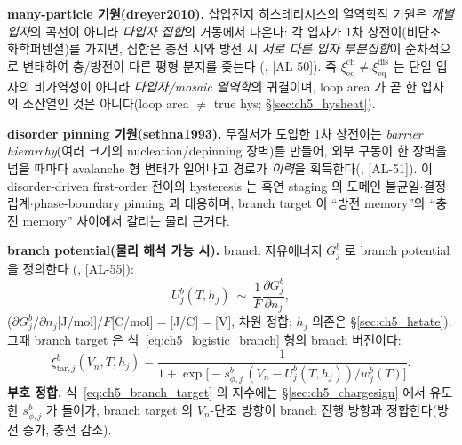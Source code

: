 \documentclass[11pt,a4paper]{article}
\newcommand{\eq}{\mathrm{eq}}
\newcommand{\dis}{\mathrm{dis}}
\newcommand{\chg}{\mathrm{ch}}
\newcommand{\tar}{\mathrm{tar}}
\newcommand{\AL}[1]{\textsf{[AL-#1]}}
\begin{document}
\textbf{many-particle 기원(dreyer2010).} 삽입전지 히스테리시스의 열역학적 기원은 \emph{개별 입자}의 곡선이
아니라 \emph{다입자 집합}의 거동에서 나온다: 각 입자가 1차 상전이(비단조 화학퍼텐셜)를 가지면, 집합은 충전 시와
방전 시 \emph{서로 다른 입자 부분집합}이 순차적으로 변태하여 충/방전이 다른 평형 분지를 좇는다
(\cite{dreyer2010}, \AL{50}). 즉 $\xi_{\eq}^{\chg}\ne\xi_{\eq}^{\dis}$ 는 단일 입자의 비가역성이 아니라
\emph{다입자/mosaic 열역학}의 귀결이며, loop area 가 곧 한 입자의 소산열인 것은 아니다(loop area $\ne$ true
hys; \S\ref{sec:ch5_hysheat}).

\textbf{disorder pinning 기원(sethna1993).} 무질서가 도입한 1차 상전이는 \emph{barrier hierarchy}(여러
크기의 nucleation/depinning 장벽)를 만들어, 외부 구동이 한 장벽을 넘을 때마다 avalanche 형 변태가 일어나고
경로가 \emph{이력}을 획득한다(\cite{sethna1993}, \AL{51}). 이 disorder-driven first-order 전이의 hysteresis
는 흑연 staging 의 도메인 불균일$\cdot$결정립계$\cdot$phase-boundary pinning 과 대응하며, branch target 이
``방전 memory''와 ``충전 memory'' 사이에서 갈리는 물리 근거다.

\textbf{branch potential(물리 해석 가능 시).} branch 자유에너지 $G_j^b$ 로 branch potential 을 정의한다
(\cite{dreyer2010,sethna1993}, \AL{55}):
\begin{equation}
U_j^b(T,h_j)\ \sim\ \frac{1}{F}\frac{\partial G_j^b}{\partial n_j},
\label{eq:ch5_branch_potential}
\end{equation}
($\partial G_j^b/\partial n_j$[J/mol]$/F$[C/mol]$=$[J/C]$=$[V], 차원 정합; $h_j$ 의존은 \S\ref{sec:ch5_hstate}).
그때 branch target 은 식~\eqref{eq:ch5_logistic_branch} 형의 branch 버전이다:
\begin{equation}
\xi_{\tar,j}^b(V_n,T,h_j)=\frac{1}{1+\exp\!\big[-s_{\phi,j}^b\,(V_n-U_j^b(T,h_j))/w_j^b(T)\big]}.
\label{eq:ch5_branch_target}
\end{equation}
\textbf{부호 정합.} 식~\eqref{eq:ch5_branch_target} 의 지수에는 \S\ref{sec:ch5_chargesign} 에서 유도한
$s_{\phi,j}^b$ 가 들어가, branch target 의 $V_n$-단조 방향이 branch 진행 방향과 정합한다(방전 증가, 충전 감소).
\end{document}
